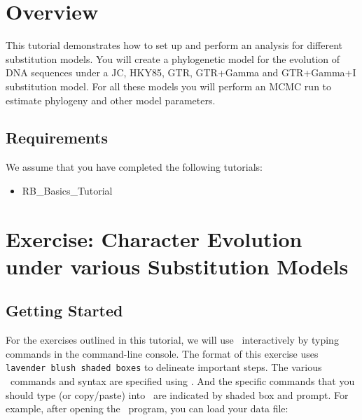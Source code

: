 \section*{Overview}


This tutorial demonstrates how to set up and perform an analysis for different substitution models. 
You will create a phylogenetic model for the evolution of DNA sequences under a JC, HKY85, GTR, GTR+Gamma and GTR+Gamma+I substitution model.
For all these models you will perform an MCMC run to estimate phylogeny and other model parameters.

\subsection*{Requirements}
We assume that you have completed the following tutorials:
\begin{itemize}
\item RB\_Basics\_Tutorial
\end{itemize}



%
%
\newpage
\FloatBarrier
\section{Exercise: Character Evolution under various Substitution Models}

%
%



\bigskip
\subsection{Getting Started}

For the exercises outlined in this tutorial, we will use \RevBayes~interactively by typing commands in the command-line console.
The format of this exercise uses \colorbox{shadecolor}{\tt lavender blush shaded boxes} to delineate important steps. 
The various \RevBayes~commands and syntax are specified using . 
And the specific commands that you should type (or copy/paste) into \RevBayes~are indicated by shaded box and prompt. 
For example, after opening the \RevBayes~program, you can load your data file:

